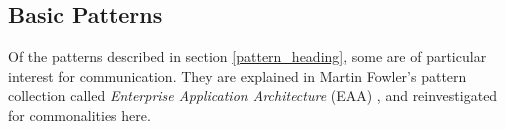 %
%
%
%
%
%
%

\subsection{Basic Patterns}
\label{basic_patterns_heading}

Of the patterns described in section \ref{pattern_heading}, some are of
particular interest for communication. They are explained in Martin Fowler's
pattern collection called \emph{Enterprise Application Architecture} (EAA)
\cite{fowler2002}, and reinvestigated for commonalities here.




